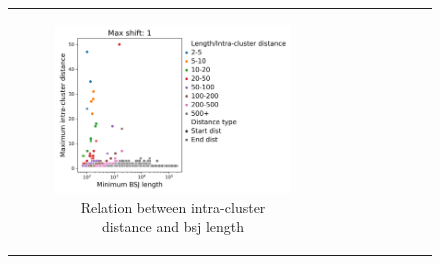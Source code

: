 \begin{figure}[H] \begin{tabular}{cc} \begin{subfigure}{0.5\textwidth}
                                           \centering

                                           \includegraphics[width=\linewidth]{chapters/4_results_and_discussion/figures/detection/distances/diff_1_scatter.png}
                                           \caption{Relation between
                                               intra-cluster distance and
                                               \gls{bsj} length}
                                           \label{fig:clustering_scatter}
                                       \end{subfigure} &
               \begin{subfigure}{0.5\textwidth} \centering


\end{subfigure}
\end{tabular}
\end{figure}
